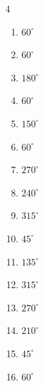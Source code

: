 \begin{multicols}{4}
\begin{enumerate}
\columnbreak %

\resetques

  \item $\displaystyle 60^{\circ}$

  \item $\displaystyle 60^{\circ}$

  \item $\displaystyle 180^{\circ}$
        \phantom{$\displaystyle =\pi$}

  \item $\displaystyle 60^{\circ}$

  \item $\displaystyle 150^{\circ}$

  \item $\displaystyle 60^{\circ}$

  \item $\displaystyle 270^{\circ}$

  \item $\displaystyle 240^{\circ}$

  \item $\displaystyle 315^{\circ}$

  \item $\displaystyle 45^{\circ}$

  \item $\displaystyle 135^{\circ}$

  \item $\displaystyle 315^{\circ}$

  \item $\displaystyle 270^{\circ}$

  \item $\displaystyle 210^{\circ}$

  \item $\displaystyle 45^{\circ}$

  \item $\displaystyle 60^{\circ}$


\end{enumerate}
\end{multicols}

